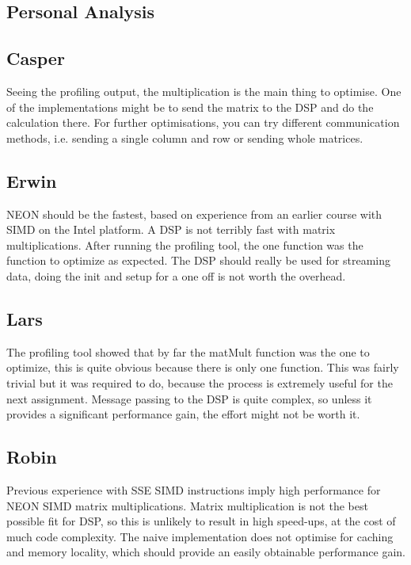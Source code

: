 \documentclass[final]{article} %
\begin{document}
\begin{appendices}
\section{Personal Analysis}\label{app:appendix-personal-analysis}

\subsection{Casper}
Seeing the profiling output, the multiplication is the main thing to optimise. One of the implementations might be to send the matrix to the DSP and do the calculation there. For further optimisations, you can try different communication methods, i.e. sending a single column and row or sending whole matrices.

\subsection{Erwin}
NEON should be the fastest, based on experience from an earlier course with SIMD on the Intel platform.
A DSP is not terribly fast with matrix multiplications.
After running the profiling tool, the one function was the function to optimize as expected.
The DSP should really be used for streaming data, doing the init and setup for a one off is not worth the overhead.

\subsection{Lars}
The profiling tool showed that by far the matMult function was the one to optimize, this is quite obvious because there is only one function.
This was fairly trivial but it was required to do, because the process is extremely useful for the next assignment. Message passing to the DSP is quite complex, so unless it provides a significant performance gain, the effort might not be worth it.

\subsection{Robin}
Previous experience with SSE SIMD instructions imply high performance for NEON SIMD matrix multiplications. Matrix multiplication is not the best possible fit for DSP, so this is unlikely to result in high speed-ups, at the cost of much code complexity. The naive implementation does not optimise for caching and memory locality, which should provide an easily obtainable performance gain.

\end{appendices}
\end{document}

